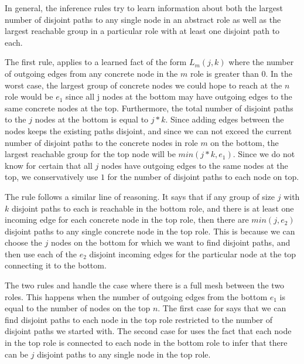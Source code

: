 \documentclass[numbers, 10pt, preprint]{sigplanconf}
\begin{document}
In general, the inference rules try to learn information about both the largest number of disjoint paths to any single node in an abstract role as well as the largest reachable group in a particular role with at least one disjoint path to each.

The first rule,  applies to a learned fact of the form $L_m(j,k)$ where the number of outgoing edges from any concrete node in the $m$ role is greater than 0. In the worst case, the largest group of concrete nodes we could hope to reach at the $n$ role would be $e_1$ since all j nodes at the bottom may have outgoing edges to the same concrete nodes at the top. Furthermore, the total number of disjoint paths to the $j$ nodes at the bottom is equal to $j*k$. Since adding edges between the nodes keeps the existing paths disjoint, and since we can not exceed the current number of disjoint paths to the concrete nodes in role $m$ on the bottom, the largest reachable group for the top node will be $min(j*k,e_1)$. Since we do not know for certain that all $j$ nodes have outgoing edges to the same nodes at the top, we conservatively use $1$ for the number of disjoint paths to each node on top.

The rule  follows a similar line of reasoning. It says that if any group of size $j$ with $k$ disjoint paths to each is reachable in the bottom role, and there is at least one incoming edge for each concrete node in the top role, then there are $min(j,e_2)$ disjoint paths to any single concrete node in the top role. This is because we can choose the $j$ nodes on the bottom for which we want to find disjoint paths, and then use each of the $e_2$ disjoint incoming edges for the particular node at the top connecting it to the bottom.

The two rules  and  handle the case where there is a full mesh between the two roles. This happens when the number of outgoing edges from the bottom $e_1$ is equal to the number of nodes on the top $n$. The first case for  says that we can find disjoint paths to each node in the top role restricted to the number of disjoint paths we started with. The second case for  uses the fact that each node in the top role is connected to each node in the bottom role to infer that there can be $j$ disjoint paths to any single node in the top role.
\end{document}
